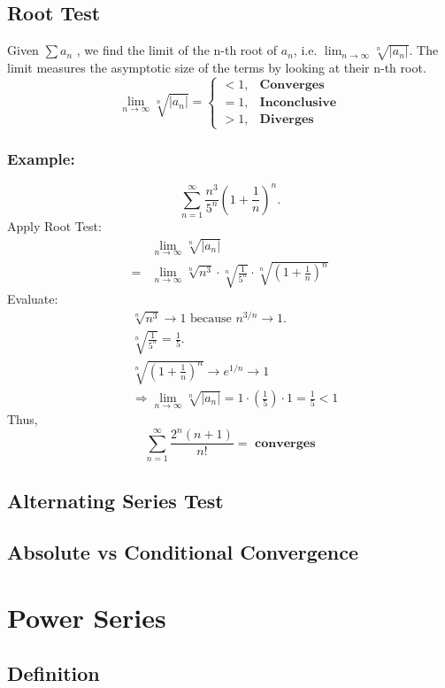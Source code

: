 \documentclass[11pt]{article}
\begin{document}
\subsection{Root Test}
Given $\displaystyle\sum a_n$ , we find the limit of the n-th root of $a_n$, i.e. $\displaystyle\lim_{n\to\infty}\sqrt[n]{\left|{a_n}\right|}$.
The limit measures the asymptotic size of the terms by looking at their n-th root.
\[
  \lim_{n\to\infty}\sqrt[n]{\left|{a_n}\right|}=
  \begin{cases}
    <1, &\textbf{Converges}\\
    =1, &\textbf{Inconclusive}\\
    >1, &\textbf{Diverges}
  \end{cases}
\]
\subsubsection*{Example:}
\[
  \sum_{n=1}^{\infty} \frac{n^3}{5^n} \left(1+\frac{1}{n}\right)^{n}.
\]
Apply Root Test:
\[
  \begin{aligned}
    &\lim_{n\to\infty}\sqrt[n]{|a_n|}\\
    =&\lim_{n\to\infty}\sqrt[n]{n^3} \cdot \sqrt[n]{\frac{1}{5^n}} \cdot \sqrt[n]{\left(1+\frac{1}{n}\right)^{n}}
  \end{aligned}
\]
Evaluate:
\[
  \begin{aligned}
    &\sqrt[n]{n^3} \to 1\text{ because } n^{3/n} \to 1.\\[10pt]
    &\sqrt[n]{\frac{1}{5^n}} = \frac{1}{5}.\\[10pt]
    &\sqrt[n]{\left(1+\frac{1}{n}\right)^{n}} \to e^{1/n} \to 1\\[10pt]
    &\Rightarrow\lim_{n\to\infty}\sqrt[n]{|a_n|}=1 \cdot \left(\frac{1}{5}\right) \cdot 1 = \frac{1}{5}<1
  \end{aligned}
\]
Thus,
\[
  \sum_{n=1}^\infty \frac{2^n(n+1)}{n!}=\textbf{ converges}
\]
\subsection{Alternating Series Test}
\subsection{Absolute vs Conditional Convergence}
\section{Power Series}
\subsection{Definition}
\end{document}
